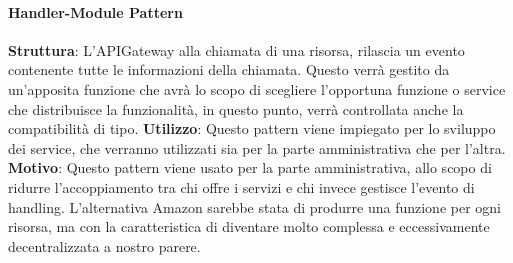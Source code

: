 \documentclass[../DefinizioneDiProdotto_v2.0.0.tex]{subfiles}
\begin{document}
\paragraph{Handler-Module Pattern}\mbox{}
\begin{addmargin}[1em]{2em}%
	\textbf{Struttura}:	L'APIGateway alla chiamata di una risorsa, rilascia un evento contenente tutte le informazioni della chiamata. Questo verrà gestito da un'apposita funzione che avrà lo scopo di  scegliere l'opportuna funzione o service che distribuisce la funzionalità, in questo punto, verrà controllata anche la compatibilità di tipo.
	\textbf{Utilizzo}:  Questo pattern viene impiegato per lo sviluppo dei service, che verranno utilizzati sia per la parte amministrativa che per l'altra.
	\textbf{Motivo}: Questo pattern viene usato per la parte amministrativa, allo scopo di ridurre l'accoppiamento tra chi offre i servizi e chi invece gestisce l'evento di handling. L'alternativa Amazon sarebbe stata di produrre una funzione per ogni risorsa, ma con la caratteristica di diventare molto complessa e eccessivamente decentralizzata a nostro parere.
\end{addmargin}
\end{document}
